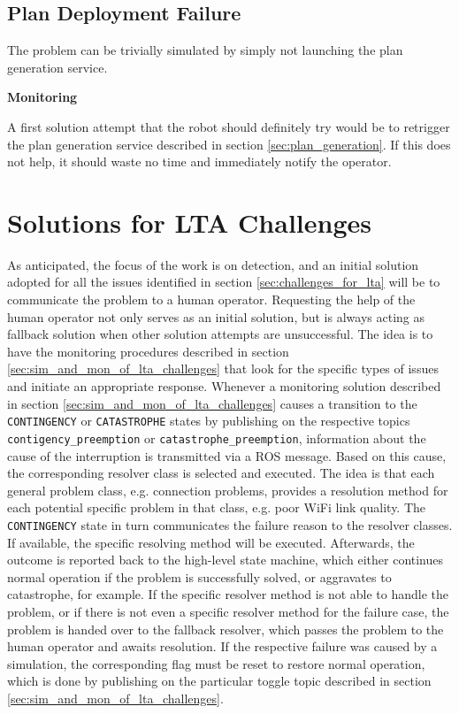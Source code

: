 \documentclass[english, master, utf8]{base/thesis_KBS}
\newcommand{\code}[1]{\colorbox{light-gray}{\texttt{#1}}}
\begin{document}
\subsection{Plan Deployment Failure}
\label{sec:sim_and_mon_plan_deployment_failures}

The problem can be trivially simulated by simply not launching the plan generation service.\newline

\noindent
\textbf{Monitoring}\newline

\noindent
A first solution attempt that the robot should definitely try would be to retrigger the plan generation service described in section \ref{sec:plan_generation}. 
If this does not help, it should waste no time and immediately notify the operator.

\section{Solutions for LTA Challenges}
\label{sec:solutions_for_lta_challenges}

As anticipated, the focus of the work is on detection, and an initial solution adopted for all the issues identified in section \ref{sec:challenges_for_lta} will be 
to communicate the problem to a human operator. Requesting the help of the human operator not only serves as an initial solution, but is always acting as fallback 
solution when other solution attempts are unsuccessful. The idea is to have the monitoring procedures described in section \ref{sec:sim_and_mon_of_lta_challenges} that 
look for the specific types of issues and initiate an appropriate response.\newline
Whenever a monitoring solution described in section \ref{sec:sim_and_mon_of_lta_challenges} causes a transition to the \code{CONTINGENCY} or \code{CATASTROPHE} states
by publishing on the respective topics \code{contigency\_preemption} or \code{catastrophe\_preemption}, information about the cause of the interruption is
transmitted via a ROS message. Based on this cause, the corresponding resolver class is selected and executed. The idea is that each general problem class, e.g.
connection problems, provides a resolution method for each potential specific problem in that class, e.g. poor WiFi link quality. The \code{CONTINGENCY} state in turn
communicates the failure reason to the resolver classes. If available, the specific resolving method will be executed. Afterwards, the outcome is reported back to the
high-level state machine, which either continues normal operation if the problem is successfully solved, or aggravates to catastrophe, for example. If the specific resolver
method is not able to handle the problem, or if there is not even a specific resolver method for the failure case, the problem is handed over to the fallback resolver,
which passes the problem to the human operator and awaits resolution. If the respective failure was caused by a simulation, the corresponding flag must be reset to restore
normal operation, which is done by publishing on the particular toggle topic described in section \ref{sec:sim_and_mon_of_lta_challenges}.\newline
\end{document}
